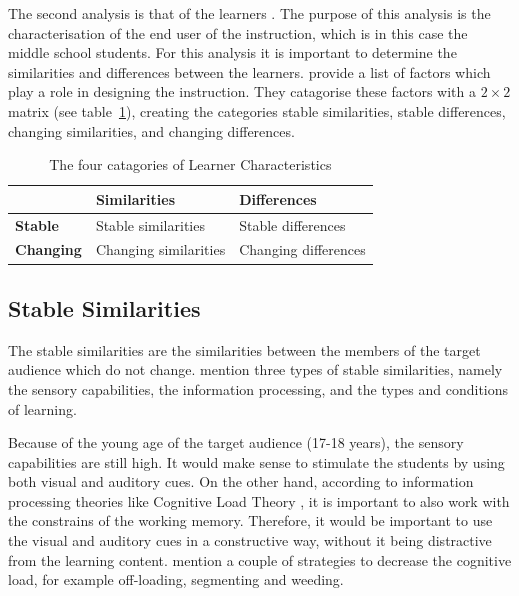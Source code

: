 \documentclass[11pt,twoside]{report} %
\begin{document}
The second analysis is that of the learners \cite{smithragan}. The purpose of this analysis is the characterisation of the end user of the instruction, which is in this case the middle school students. For this analysis it is important to determine the similarities and differences between the learners.  provide a list of factors which play a role in designing the instruction. They catagorise these factors with a ${2 \times 2}$ matrix (see table~\ref{tab:learneranalysis}), creating the categories stable similarities, stable differences, changing similarities, and changing differences.

\begin{table}[h]
\begin{center}
\begin{tabular}{| l | l | l |}
\hline
 & \textbf{Similarities} & \textbf{Differences} \\ \hline
\textbf{Stable} & Stable similarities & Stable differences \\ \hline
\textbf{Changing} & Changing similarities & Changing differences \\ \hline
\end{tabular}
\end{center}
\caption{\footnotesize The four catagories of Learner Characteristics \protect \cite{smithragan} \label{tab:learneranalysis}}
\end{table}


\subsection{Stable Similarities}

The stable similarities are the similarities between the members of the target audience which do not change.  mention three types of stable similarities, namely the sensory capabilities, the information processing, and the types and conditions of learning.

Because of the young age of the target audience (17-18 years), the sensory capabilities are still high. It would make sense to stimulate the students by using both visual and auditory cues. On the other hand, according to information processing theories like Cognitive Load Theory \cite{smithragan}, it is important to also work with the constrains of the working memory. Therefore, it would be important to use the visual and auditory cues in a constructive way, without it being distractive from the learning content.  mention a couple of strategies to decrease the cognitive load, for example off-loading, segmenting and weeding.
\end{document}
